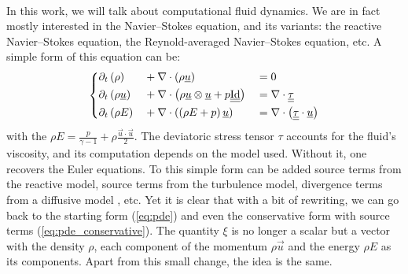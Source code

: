     \paragraph{}
    In this work, we will talk about computational fluid dynamics.
    We are in fact mostly interested in the Navier--Stokes equation, and its variants: the reactive Navier--Stokes equation, the Reynold-averaged Navier--Stokes equation, etc.
    A simple form of this equation can be:
    \begin{equation}\label{eq:ns}
      \left\{\begin{aligned}
        &\partial_t\left(\rho         \right) &&+ \nabla\cdot\left( \rho \underline{u} \right) &&= 0 \\
        &\partial_t\left(\rho \underline{u} \right) &&+ \nabla\cdot\left( \rho \underline{u} \otimes \underline{u} + p \underline{\underline{\operatorname{Id}}} \right) &&= \nabla\cdot \underline{\underline{\tau}}\\
        &\partial_t\left( \rho E      \right) &&+ \nabla\cdot\left( \left(\rho E + p\right) \underline{u} \right) &&=
          \nabla\cdot\left( \underline{\underline{\tau}} \cdot \underline{u} \right)
      \end{aligned}\right.
    \end{equation}
    with the  $\rho E = \frac{p}{\gamma - 1} + \rho\frac{\vec{u} \cdot \vec{u}}{2}$.
    The deviatoric stress tensor $\tau$ accounts for the fluid's viscosity, and its computation depends on the model used.
    Without it, one recovers the Euler equations.
    To this simple form can be added source terms from the reactive model, source terms from the turbulence model, divergence terms from a diffusive model , etc.
    Yet it is clear that with a bit of rewriting, we can go back to the starting form (\ref{eq:pde}) and even the conservative form with source terms (\ref{eq:pde_conservative}).
    The quantity $\xi$ is no longer a scalar but a vector with the density $\rho$, each component of the momentum $\rho\vec{u}$ and the energy $\rho E$ as its components.
    Apart from this small change, the idea is the same.

